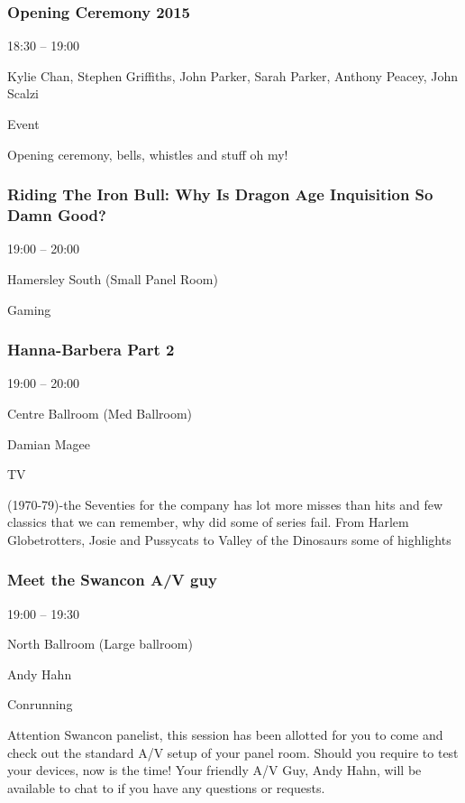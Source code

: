 \documentclass{scrreprt}
\begin{document}
\begin{multicols}{2}
\subsubsection*{Opening Ceremony 2015}\begin{description}
\setlength{\itemsep}{0pt}
\setlength{\parsep}{0pt}
\setlength{\parskip}{0pt}
\item[Time:]{18:30 -- 19:00}
\item[People:]{Kylie Chan, Stephen Griffiths, John Parker, Sarah Parker, Anthony Peacey, John Scalzi}
\item[Tags:]{Event}\end{description}
Opening ceremony, bells, whistles and stuff oh my!
\subsubsection*{Riding The Iron Bull: Why Is Dragon Age Inquisition So Damn Good?}\begin{description}
\setlength{\itemsep}{0pt}
\setlength{\parsep}{0pt}
\setlength{\parskip}{0pt}
\item[Time:]{19:00 -- 20:00}
\item[Venue:]{Hamersley South (Small Panel Room)}
\item[Tags:]{Gaming}\end{description}

\subsubsection*{Hanna-Barbera Part 2}\begin{description}
\setlength{\itemsep}{0pt}
\setlength{\parsep}{0pt}
\setlength{\parskip}{0pt}
\item[Time:]{19:00 -- 20:00}
\item[Venue:]{Centre Ballroom (Med Ballroom)}
\item[People:]{Damian Magee}
\item[Tags:]{TV}\end{description}
(1970-79)-the Seventies for the company has lot more misses than hits and few classics that we can remember, why did some of series fail.  From Harlem Globetrotters, Josie and Pussycats to Valley of the Dinosaurs some of highlights
\subsubsection*{Meet the Swancon A/V guy}\begin{description}
\setlength{\itemsep}{0pt}
\setlength{\parsep}{0pt}
\setlength{\parskip}{0pt}
\item[Time:]{19:00 -- 19:30}
\item[Venue:]{North Ballroom (Large ballroom)}
\item[People:]{Andy Hahn}
\item[Tags:]{Conrunning}\end{description}
Attention Swancon panelist, this session has been allotted for you to come and check out the standard A/V setup of your panel room. Should you require to test your devices, now is the time! Your friendly A/V Guy, Andy Hahn, will be available to chat to if you have any questions or requests.

\end{multicols}
\end{document}
